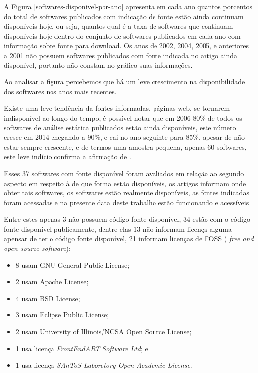 A Figura \ref{softwares-disponivel-por-ano} apresenta em cada ano quantos
porcentos do total de softwares publicados com indicação de fonte estão ainda continuam
disponíveis hoje, ou seja, quantos qual é a taxa de softwares que continuam
disponíveis hoje dentro do conjunto de softwares publicados em cada ano com
informação sobre fonte para download.  Os anos de 2002, 2004, 2005, e
anteriores a 2001 não possuem softwares publicados com fonte indicada no artigo
ainda disponível, portanto não constam no gráfico suas informações.

Ao analisar a figura percebemos que há um leve crescimento na disponibilidade
dos softwares nos anos mais recentes.

Existe uma leve tendência da fontes informadas, páginas web, se tornarem
indisponível ao longo do tempo, é possível notar que em 2006 80\% de todos os
softwares de análise estática publicados estão ainda disponíveis, este número
cresce em 2014 chegando a 90\%, e cai no ano seguinte para 85\%, apesar de não
estar sempre crescente, e de termos uma amostra pequena, apenas 60 softwares,
este leve indício confirma a afirmação de .

Esses 37 softwares com fonte disponível foram avaliados em relação ao segundo
aspecto em respeito à de que forma estão disponíveis, os artigos informam onde
obter tais softwares, os softwares estão realmente disponíveis, as fontes
indicadas foram acessadas e na presente data deste trabalho estão funcionando e
acessíveis

Entre estes apenas 3 não possuem código fonte disponível, 34 estão com o código
fonte disponível publicamente, dentre elas 13 não informam licença alguma
apensar de ter o código fonte disponível, 21 informam licenças de FOSS ({\it
free and open source software}):

\begin{itemize}
  \item 8 usam GNU General Public License;
  \item 2 usam Apache License;
  \item 4 usam BSD License;
  \item 3 usam Eclipse Public License;
  \item 2 usam University of Illinois/NCSA Open Source License;
  \item 1 usa licença {\it FrontEndART Software Ltd}; e
  \item 1 usa licença {\it SAnToS Laboratory Open Academic License}.
\end{itemize}

